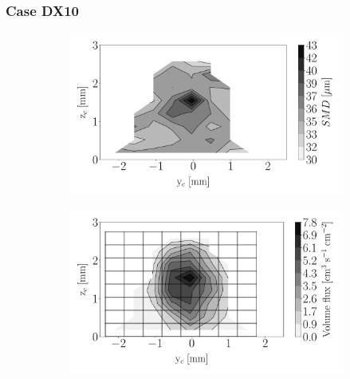 \subsubsection*{Case DX10}





\begin{figure}[h!]
\centering
\begin{subfigure}[b]{0.3\textwidth}
	\centering
   \includegraphics[scale=\scaleSLIBIMER]{./part3_applications/figures_ch8_resolved/injectors_SLI/dx10_xD05p00_SMD_map}
\end{subfigure}
   \hspace{0.17in}
\begin{subfigure}[b]{0.3\textwidth}
	\centering
   \includegraphics[scale=\scaleSLIBIMER]{./part3_applications/figures_ch8_resolved/injectors_SLI/dx10_xD05p00_volume_flux_map}
\end{subfigure}

\end{figure}
